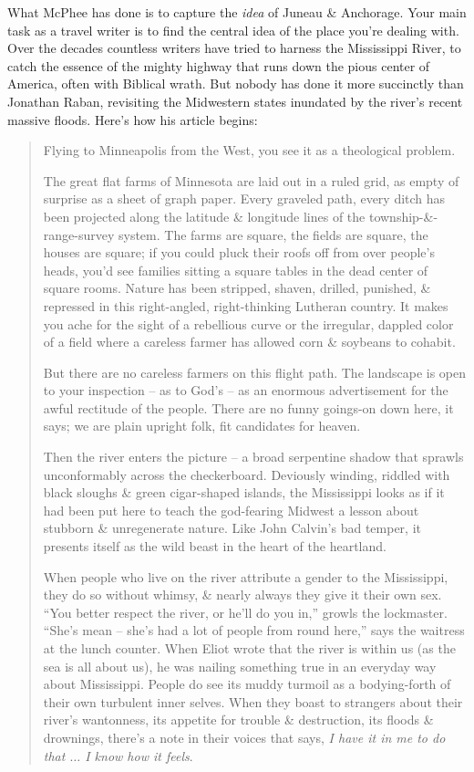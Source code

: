 \documentclass{article}
\begin{document}
What McPhee has done is to capture the \textit{idea} of Juneau \& Anchorage. Your main task as a travel writer is to find the central idea of the place you're dealing with. Over the decades countless writers have tried to harness the Mississippi River, to catch the essence of the mighty highway that runs down the pious center of America, often with Biblical wrath. But nobody has done it more succinctly than Jonathan Raban, revisiting the Midwestern states inundated by the river's recent massive floods. Here's how his article begins:
\begin{quotation}
	Flying to Minneapolis from the West, you see it as a theological problem.
	
	The great flat farms of Minnesota are laid out in a ruled grid, as empty of surprise as a sheet of graph paper. Every graveled path, every ditch has been projected along the latitude \& longitude lines of the township-\&-range-survey system. The farms are square, the fields are square, the houses are square; if you could pluck their roofs off from over people's heads, you'd see families sitting a square tables in the dead center of square rooms. Nature has been stripped, shaven, drilled, punished, \& repressed in this right-angled, right-thinking Lutheran country. It makes you ache for the sight of a rebellious curve or the irregular, dappled color of a field where a careless farmer has allowed corn \& soybeans to cohabit.
	
	But there are no careless farmers on this flight path. The landscape is open to your inspection -- as to God's -- as an enormous advertisement for the awful rectitude of the people. There are no funny goings-on down here, it says; we are plain upright folk, fit candidates for heaven.
	
	Then the river enters the picture -- a broad serpentine shadow that sprawls unconformably across the checkerboard. Deviously winding, riddled with black sloughs \& green cigar-shaped islands, the Mississippi looks as if it had been put here to teach the god-fearing Midwest a lesson about stubborn \& unregenerate nature. Like John Calvin's bad temper, it presents itself as the wild beast in the heart of the heartland.
	
	When people who live on the river attribute a gender to the Mississippi, they do so without whimsy, \& nearly always they give it their own sex. ``You better respect the river, or he'll do you in,'' growls the lockmaster. ``She's mean -- she's had a lot of people from round here,'' says the waitress at the lunch counter. When Eliot wrote that the river is within us (as the sea is all about us), he was nailing something true in an everyday way about Mississippi. People do see its muddy turmoil as a bodying-forth of their own turbulent inner selves. When they boast to strangers about their river's wantonness, its appetite for trouble \& destruction, its floods \& drownings, there's a note in their voices that says, \textit{I have it in me to do that $\ldots$ I know how it feels}.
\end{quotation}
\end{document}
